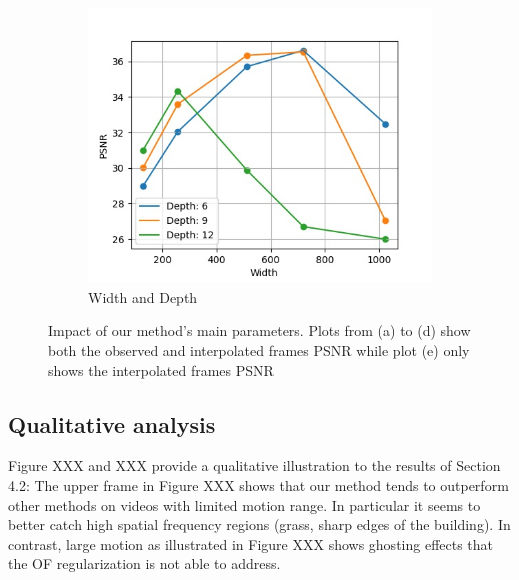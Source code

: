 \documentclass{article}
\begin{document}
\begin{figure}[h]
\begin{subfigure}{0.3\textwidth}
\includegraphics[width=1\linewidth]{Width_Depth.jpg}
    \caption{Width and Depth}
\end{subfigure}
\caption{Impact of our method's main parameters. Plots from (a) to (d)
show both the observed and interpolated frames PSNR
while plot (e) only shows the interpolated frames PSNR}
\label{fig_abl}
\end{figure}


\subsection{Qualitative analysis}
\label{sec_qua}

Figure XXX and XXX provide a qualitative illustration to the results of Section 4.2:
The upper frame in Figure XXX shows that our method tends to outperform other methods on videos with limited motion range.
In particular it seems to better catch high spatial frequency regions (grass, sharp edges of the building).
In contrast, large motion as illustrated in Figure XXX shows ghosting effects that the OF regularization is not able to address.
\end{document}
